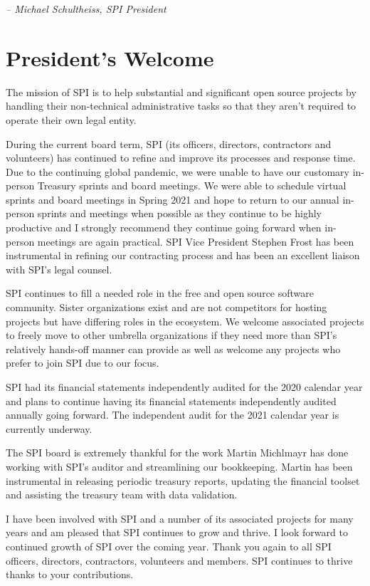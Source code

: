 \documentclass[a4paper]{report}
\begin{document}
  \emph{-- Michael Schultheiss, SPI President}

\newpage

\tableofcontents

\newpage

\chapter{President's Welcome}
\label{sec:president}

The mission of SPI is to help substantial and significant open source
projects by handling their non-technical administrative tasks so that
they aren't required to operate their own legal entity.

During the current board term, SPI (its officers, directors, contractors
and volunteers) has continued to refine and improve its processes and
response time.  Due to the continuing global pandemic, we were unable to
have our customary in-person Treasury sprints and board meetings. We
were able to schedule virtual sprints and board meetings in Spring 2021
and hope to return to our annual in-person sprints and meetings when
possible as they continue to be highly productive and I strongly
recommend they continue going forward when in-person meetings are again
practical. SPI Vice President Stephen Frost has been instrumental in
refining our contracting process and has been an excellent liaison with
SPI's legal counsel.

SPI continues to fill a needed role in the free and open source software
community. Sister organizations exist and are not competitors for
hosting projects but have differing roles in the ecosystem. We welcome
associated projects to freely move to other umbrella organizations if
they need more than SPI's relatively hands-off manner can provide as
well as welcome any projects who prefer to join SPI due to our focus.

SPI had its financial statements independently audited for the 2020 calendar
year and plans to continue having its financial statements independently
audited annually going forward. The independent audit for the 2021 calendar
year is currently underway.

The SPI board is extremely thankful for the work Martin Michlmayr has
done working with SPI's auditor and streamlining our bookkeeping. Martin
has been instrumental in releasing periodic treasury reports, updating
the financial toolset and assisting the treasury team with data
validation.

I have been involved with SPI and a number of its associated projects
for many years and am pleased that SPI continues to grow and thrive.
I look forward to continued growth of SPI over the coming year.  Thank
you again to all SPI officers, directors, contractors, volunteers and
members. SPI continues to thrive thanks to your contributions.
\end{document}
